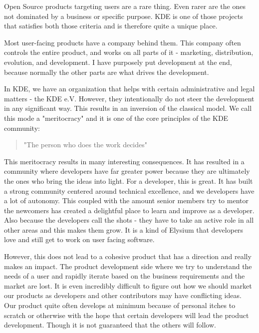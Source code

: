 

\noindent{}Open Source products targeting users are a rare thing. Even rarer are the ones not dominated by a business or specific purpose. KDE is one of those projects that satisfies both those criteria and is therefore quite a unique place.

Most user-facing products have a company behind them. This company often controls the entire product, and works on all parts of it - marketing, distribution, evolution, and development. I have purposely put development at the end, because normally the other parts are what drives the development.

In KDE, we have an organization that helps with certain administrative and legal matters - the KDE e.V. However, they intentionally do not steer the development in any significant way. This results in an inversion of the classical model. We call this mode a "meritocracy" and it is one of the core principles of the KDE community:

\begin{quote}"The person who does the work decides"\end{quote}

This meritocracy results in many interesting consequences. It has resulted in a community where developers have far greater power because they are ultimately the ones who bring the ideas into light. For a developer, this is great. It has built a strong community centered around technical excellence, and we developers have a lot of autonomy. This coupled with the amount senior members try to mentor the newcomers has created a delightful place to learn and improve as a developer. Also because the developers call the shots - they have to take an active role in all other areas and this makes them grow. It is a kind of Elysium that developers love and still get to work on user facing software.

However, this does not lead to a cohesive product that has a direction and really makes an impact. The product development side where we try to understand the needs of a user and rapidly iterate based on the business requirements and the market are lost. It is even incredibly difficult to figure out how we should market our products as developers and other contributors may have conflicting ideas. Our product quite often develops at minimum because of personal itches to scratch or otherwise with the hope that certain developers will lead the product development. Though it is not guaranteed that the others will follow.


